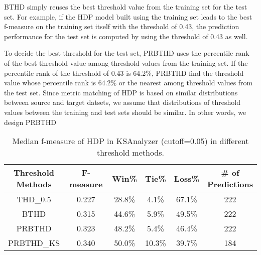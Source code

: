 BTHD simply reuses the best threshold value from the training set for the test set. For example, if the HDP model built using the training set leads to the best f-measure on the training set itself with the threshold of 0.43, the prediction performance for the test set is computed by using the threshold of 0.43 as well.

To decide the best threshold for the test set, PRBTHD uses the percentile rank of the best threshold value among threshold values from the training set. If the percentile rank of the threshold of 0.43 is 64.2\%, PRBTHD find the threshold value whose percentile rank is 64.2\% or the nearest among threshold values from the test set. Since metric matching of HDP is based on similar distributions between source and target datsets, we assume that distributions of threshold values between the training and test sets should be similar. In other words, we design PRBTHD

\begin{table}[t]
\scriptsize
\centering
\caption{Median f-measure of HDP in KSAnalyzer (cutoff=0.05) in different threshold methods.
}
\label{tab:threshold_result}
\begin{tabular}{|c||c||c|c|c||c|}
\hline

\specialcell{{\bf Threshold}\\{\bf Methods}}
& {\bf F-measure}
& {\bf Win}\%
& {\bf Tie}\% 
& {\bf Loss}\%
& \specialcell{{\bf \# of}\\{\bf Predictions}} \\ \hline \hline
THD\_0.5 & 0.227	& 28.8\% & 4.1\%	& 67.1\% & 222\\ \hline
BTHD & 0.315	& 44.6\% & 5.9\%	& 49.5\% & 222\\ \hline
PRBTHD & 0.323	& 48.2\% & 5.4\%	& 46.4\% & 222\\ \hline
PRBTHD\_KS& 0.340	& 50.0\% & 10.3\%	& 39.7\% & 184\\ \hline



\end{tabular}
\end{table}


